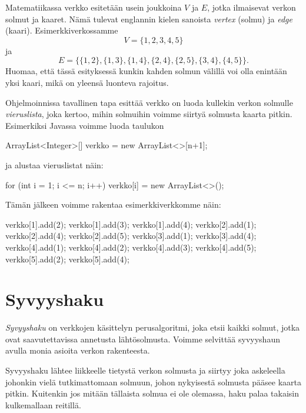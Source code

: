 Matematiikassa verkko esitetään usein joukkoina $V$ ja $E$,
jotka ilmaisevat verkon solmut ja kaaret.
Nämä tulevat englannin kielen sanoista \emph{vertex} (solmu)
ja \emph{edge} (kaari).
Esimerkkiverkossamme
\[ V = \{1,2,3,4,5\} \]
ja
\[ E = \{\{1,2\},\{1,3\},\{1,4\},\{2,4\},\{2,5\},\{3,4\},\{4,5\} \}.\]
Huomaa, että tässä esityksessä kunkin kahden solmun välillä
voi olla enintään yksi kaari, mikä on yleensä luonteva rajoitus.

Ohjelmoinnissa tavallinen tapa esittää verkko on
luoda kullekin verkon solmulle \emph{vieruslista},
joka kertoo, mihin solmuihin voimme siirtyä solmusta kaarta pitkin.
Esimerkiksi Javassa voimme luoda taulukon

\begin{code}
ArrayList<Integer>[] verkko = new ArrayList<>[n+1];
\end{code}

ja alustaa vieruslistat näin:

\begin{code}
for (int i = 1; i <= n; i++) {
    verkko[i] = new ArrayList<>();
}
\end{code}

Tämän jälkeen voimme rakentaa esimerkkiverkkomme näin:

\begin{code}
verkko[1].add(2);
verkko[1].add(3);
verkko[1].add(4);
verkko[2].add(1);
verkko[2].add(4);
verkko[2].add(5);
verkko[3].add(1);
verkko[3].add(4);
verkko[4].add(1);
verkko[4].add(2);
verkko[4].add(3);
verkko[4].add(5);
verkko[5].add(2);
verkko[5].add(4);
\end{code}

\section{Syvyyshaku}

\emph{Syvyyshaku} on verkkojen käsittelyn perusalgoritmi,
joka etsii kaikki solmut, jotka ovat saavutettavissa
annetusta lähtösolmusta.
Voimme selvittää syvyyshaun avulla monia asioita
verkon rakenteesta.

Syvyyshaku lähtee liikkeelle tietystä verkon solmusta ja siirtyy
joka askeleella johonkin vielä tutkimattomaan solmuun,
johon nykyisestä solmusta pääsee kaarta pitkin.
Kuitenkin jos mitään tällaista solmua ei ole olemassa,
haku palaa takaisin kulkemallaan reitillä.

